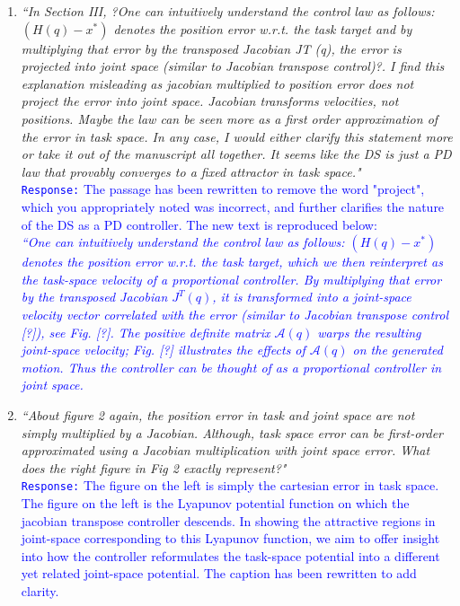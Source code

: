 \documentclass[10pt,stdletter,dateno]{newlfm}
\begin{document}
\begin{newlfm}
\begin{enumerate}
\item \textit{``In Section III, ?One can intuitively understand the control law as follows:$(H(q) - x^*)$ denotes the
position error w.r.t. the task target and by multiplying that error by the transposed Jacobian JT (q),
the error is projected into joint space (similar to Jacobian transpose control)?. I find this explanation
misleading as jacobian multiplied to position error does not project the error into joint space. Jacobian
transforms velocities, not positions. Maybe the law can be seen more as a first order approximation
of the error in task space. In any case, I would either clarify this statement more or take it out of the
manuscript all together. It seems like the DS is just a PD law that provably converges to a fixed attractor
in task space."}\\
\textcolor{blue}{\texttt{Response:} \small The passage has been rewritten to remove the word "project", which you appropriately noted was incorrect, and further clarifies the nature of the DS as a PD controller. The new text is reproduced below: \\
\textit{``One can intuitively understand the control law as follows: $(H(q) - x^*)$ denotes the position error w.r.t. the task target, which we then reinterpret as the task-space velocity of a proportional controller. By multiplying that error by the transposed Jacobian $J^T(q)$, it is transformed into a joint-space velocity vector correlated with the error (similar to Jacobian transpose control [?]), see Fig. [?]. The positive definite matrix $\mathcal{A}(q)$ warps the resulting joint-space velocity; Fig. [?] illustrates the effects of  $\mathcal{A}(q)$ on the generated motion. Thus the controller can be thought of as a proportional controller in joint space.}}\\

\item \textit{``About figure 2 again, the position error in task and joint space are not simply multiplied by a Jacobian.
Although, task space error can be first-order approximated using a Jacobian multiplication with
joint space error. What does the right figure in Fig 2 exactly represent?"}\\
\textcolor{blue}{\texttt{Response:} \small The figure on the left is simply the cartesian error in task space. The figure on the left is the Lyapunov potential function on which the jacobian transpose controller descends. In showing the attractive regions in joint-space corresponding to this Lyapunov function, we aim to offer insight into how the controller reformulates the task-space potential into a different yet related joint-space potential. The caption has been rewritten to add clarity.}\\


\end{enumerate}
\end{newlfm}
\end{document}
